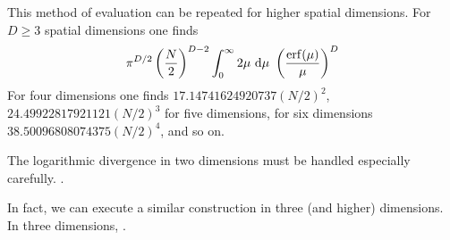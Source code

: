 This method of evaluation can be repeated for higher spatial dimensions.
For $D\geq3$ spatial dimensions one finds
\begin{equation}
    \pi^{D/2} \left(\frac{N}{2}\right)^{D-2} \int_0^\infty 2\mu\ \mathrm{d}\mu\ \left(\frac{\erf(\mu)}{\mu}\right)^D
\end{equation}
For four dimensions one finds $17.14741624920737 (N/2)^2$, $24.49922817921121 (N/2)^3$ for five dimensions, for six dimensions $38.50096808074375 (N/2)^4$, and so on.

The logarithmic divergence in two dimensions must be handled especially carefully.
.

In fact, we can execute a similar construction in three (and higher) dimensions.  In three dimensions, .
